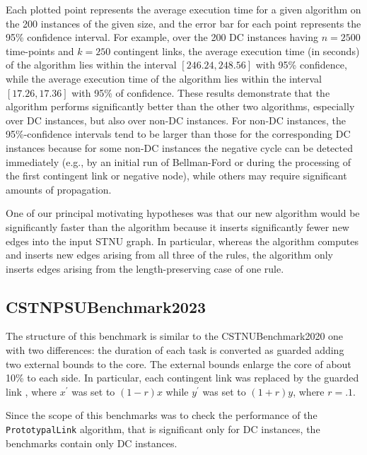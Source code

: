 \documentclass[a4paper,11pt]{article}
\begin{document}
Each plotted point represents the average execution time for a given algorithm on the 200 instances of the given size, and the error bar for each point represents the 95\% confidence interval.
For example, over the 200 DC instances having $n=2500$ time-points and $k=250$ contingent links,
the average execution time (in seconds) of the \morrisFourteen algorithm lies within the interval
$[246.24, 248.56]$ with 95\% confidence, while the average execution time of the \rulTwenty algorithm
lies within the interval $[17.26,17.36]$ with 95\% of confidence.
%
These results demonstrate that the \rulTwenty algorithm performs significantly better than the other two algorithms, especially over DC instances, but also over non-DC instances.
For non-DC instances, the 95\%-confidence intervals tend to be larger than those for the corresponding DC instances because for some non-DC instances the negative cycle can be detected immediately (e.g., by an
initial run of Bellman-Ford or during the processing of the first contingent link or negative node), while
others may require significant amounts of propagation.

One of our principal motivating hypotheses was that our new algorithm would be significantly
faster than the \RULminus algorithm because it inserts significantly fewer new edges into the input STNU graph.
In particular, whereas the \RULminus algorithm computes and inserts new edges arising
from all three of the \RULminus rules, the \rulTwenty algorithm  only inserts edges arising from the length-preserving case of one rule.






\subsection{CSTNPSUBenchmark2023}

The structure of this benchmark is similar to the CSTNUBenchmark2020 one with two differences: the duration of each task is converted as guarded adding two external bounds to the core. The external bounds enlarge the core of about 10\% to each side.
In particular, each contingent link  was replaced by the guarded link , where $x^\prime$ was set to $(1-r)x$ while $y^\prime$ was set to $(1+r)y$, where $r=.1$. 

Since the scope of this benchmarks was to check the performance of the \texttt{PrototypalLink} algorithm, that is significant only for DC instances,
the benchmarks contain only DC instances.
\end{document}
